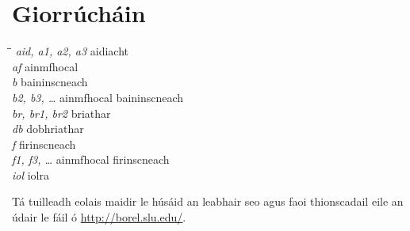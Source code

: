 \chapter*{Giorr\'uch\'ain} 
\begin{tabbing}
\hspace*{35ex}\=\hspace{25ex}\=\kill
\> {\it aid, a1, a2, a3} \> aidiacht \\
\> {\it af} \> ainmfhocal \\
\> {\it b} \> baininscneach \\
\> {\it b2, b3, \ldots} \> ainmfhocal baininscneach \\
\> {\it br, br1, br2} \> briathar \\
\> {\it db} \> dobhriathar \\
\> {\it f} \> firinscneach \\
\> {\it f1, f3, \ldots} \> ainmfhocal firinscneach \\
\> {\it iol} \> iolra \\
\end{tabbing}

\vspace{7ex}
T\'a tuilleadh eolais maidir le h\'us\'aid an leabhair seo
agus faoi thionscadail eile an \'udair le f\'ail \'o
\href{http://borel.slu.edu/}{http://borel.slu.edu/}.


\endinput
